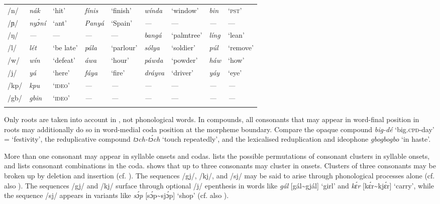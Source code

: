 \begin{sidewaystable}
\begin{tabularx}{\textwidth}{l lX lX lX lX}
/n/ & \itshape nák & ‘hit’ & \itshape fínis & ‘finish’ & \itshape wínda & ‘window’ & \itshape bin & ‘\textsc{pst’}\\
/ɲ/ & \itshape nyɔ́ní & ‘ant’ & \itshape Panyá & ‘Spain’ & \itshape {}--- & {}--- & \itshape {}--- & {}---\\
/ŋ/ & \itshape {}--- & {}--- & \itshape {}--- & {}--- & \itshape bangá & ‘palmtree’ & \itshape líng & ‘lean’\\
/l/ & \itshape lét & ‘be late’ & \itshape pála & ‘parlour’ & \itshape sólya & ‘soldier’ & \itshape púl & ‘remove’\\
/w/ & \itshape wín & ‘defeat’ & \itshape áwa & ‘hour’ & \itshape páwda & ‘powder’ & \itshape háw & ‘how’\\
/j/ & \itshape yá & ‘here’ & \itshape fáya & ‘fire’ & \itshape dráyva & ‘driver’ & \itshape yáy & ‘eye’\\
/kp/ & \itshape kpu & ‘\textsc{ideo}’ & \itshape {}--- & \textit{{}---} & \itshape {}--- & {}--- & \itshape {}--- & \textit{{}---}\\
/gb/ & \itshape gbin & ‘\textsc{ideo}’ & \itshape {}--- & \textit{{}---} & \itshape {}--- & {}--- & \itshape {}--- & \textit{{}---}\\
\lspbottomrule
\end{tabularx}
\end{sidewaystable}
Only roots are taken into account in , not phonological words. In compounds, all consonants that may appear in word-final position in roots may additionally do so in word-medial coda position at the morpheme boundary. Compare the opaque compound \textit{big-dé} ‘big.\textsc{cpd}{}-day’ = ‘festivity’, the reduplicative compound \textit{tɔch-tɔ́ch} ‘touch repeatedly’, and the lexicalised reduplication and ideophone \textit{gbogbogbo} ‘in haste’.


More than one consonant may appear in syllable onsets and codas.  lists the possible permutations of consonant clusters in syllable onsets, and  lists consonant combinations in the coda.  shows that up to three consonants may cluster in onsets. Clusters of three consonants may be broken up by deletion and insertion (cf. ). The sequences /gj/, /kj/, and /sj/ may be said to arise through phonological processes alone (cf. also ). The sequences /gj/ and /kj/ surface through optional /j/ epenthesis in words like \textit{gál} [gál{\textasciitilde}gjál] ‘girl’ and \textit{kɛ́r} [kɛ́r{\textasciitilde}kjɛ́r] ‘carry’, while the sequence /sj/ appears in variants like \textit{sɔ́p} [sɔ́p{\textasciitilde}sjɔ́p] ‘shop’ (cf. also ).


